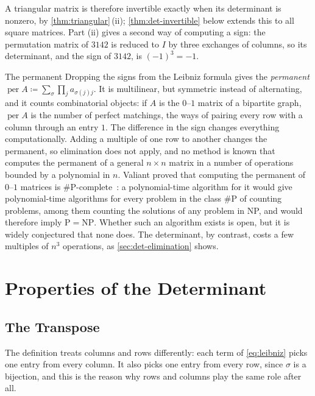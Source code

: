 A triangular matrix is therefore invertible exactly when its determinant is nonzero, by \cref{thm:triangular}\,(ii); \cref{thm:det-invertible} below extends this to all square matrices. Part (ii) gives a second way of computing a sign: the permutation matrix of $3142$ is reduced to $I$ by three exchanges of columns, so its determinant, and the sign of $3142$, is $(-1)^3=-1$.

\begin{note}{The permanent}
Dropping the signs from the Leibniz formula gives the \emph{permanent} $\operatorname{per}A\coloneqq\sum_{\sigma}\prod_ja_{\sigma(j)j}$. It is multilinear, but symmetric instead of alternating, and it counts combinatorial objects: if $A$ is the $0$--$1$ matrix of a bipartite graph, $\operatorname{per}A$ is the number of perfect matchings, the ways of pairing every row with a column through an entry $1$. The difference in the sign changes everything computationally. Adding a multiple of one row to another changes the permanent, so elimination does not apply, and no method is known that computes the permanent of a general $n\times n$ matrix in a number of operations bounded by a polynomial in $n$. Valiant proved that computing the permanent of $0$--$1$ matrices is $\#\mathrm P$-complete~\cite{valiant1979}: a polynomial-time algorithm for it would give polynomial-time algorithms for every problem in the class $\#\mathrm P$ of counting problems, among them counting the solutions of any problem in NP, and would therefore imply $\mathrm P=\mathrm{NP}$. Whether such an algorithm exists is open, but it is widely conjectured that none does. The determinant, by contrast, costs a few multiples of $n^3$ operations, as \cref{sec:det-elimination} shows.
\end{note}

\section{Properties of the Determinant}
\label{sec:det-properties}

\subsection{The Transpose}

The definition treats columns and rows differently: each term of \eqref{eq:leibniz} picks one entry from every column. It also picks one entry from every row, since $\sigma$ is a bijection, and this is the reason why rows and columns play the same role after all.

